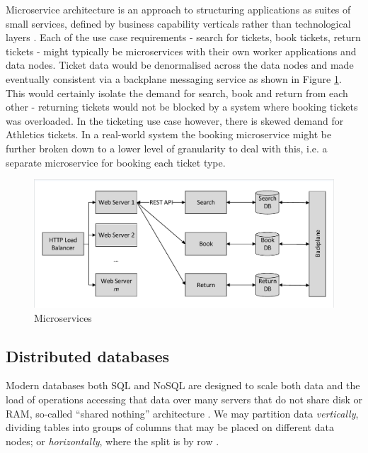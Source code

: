 Microservice architecture is an approach to structuring applications as suites of small services, defined by business capability verticals rather than technological layers \cite{RN1069} \cite{RN1070}.  Each of the use case requirements - search for tickets, book tickets, return tickets - might typically be microservices with their own worker applications and data nodes.  Ticket data would be denormalised across the data nodes and made eventually consistent via a backplane messaging service \cite{RN1071} as shown in Figure \ref{figure:microservices}.  This would certainly isolate the demand for search, book and return from each other - returning tickets would not be blocked by a system where booking tickets was overloaded.  In the ticketing use case however, there is skewed demand for Athletics tickets.  In a real-world system the booking microservice might be further broken down to a lower level of granularity to deal with this, i.e. a separate microservice for booking each ticket type.

\begin{figure}
\caption{Microservices}
\label{figure:microservices}
\centering
\includegraphics[trim = 5 5 5 5, clip, width=\textwidth]{img/microservices}
\end{figure}

%
%
\FloatBarrier
\subsection{Distributed databases}\label{sec:distributed-databases}
Modern databases both SQL and NoSQL are designed to scale both data and the load of operations accessing that data over many servers that do not share disk or RAM, so-called ``shared nothing'' architecture \cite{RN67}.  We may partition data {\itshape vertically}, dividing tables into groups of columns that may be placed on different data nodes; or {\itshape horizontally}, where the split is by row \cite{RN68}. 

